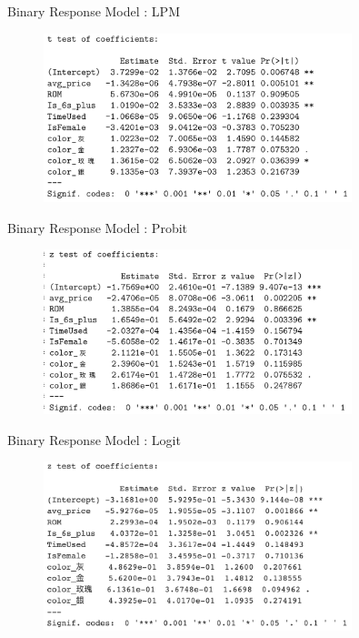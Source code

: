 \documentclass[11pt]{beamer}
\begin{document}
\begin{frame}[fragile]{Binary Response Model : LPM}

	\begin{figure}
		\begin{center}
			\includegraphics[width=0.8\textwidth]{figure/f09.png}
		\end{center}
	\end{figure}

\end{frame}

\begin{frame}[fragile]{Binary Response Model : Probit}

	\begin{figure}
		\begin{center}
			\includegraphics[width=0.8\textwidth]{figure/f10.png}
		\end{center}
	\end{figure}

\end{frame}

\begin{frame}[fragile]{Binary Response Model : Logit}

	\begin{figure}
		\begin{center}
			\includegraphics[width=0.8\textwidth]{figure/f11.png}
		\end{center}
	\end{figure}

\end{frame}
\end{document}
